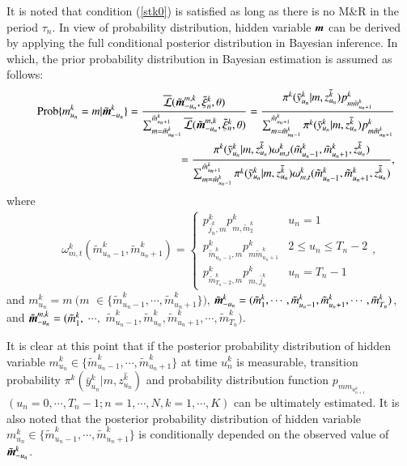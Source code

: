 \documentclass[a4paper,oneside,onecolumn,preprint,10pt,authoryear]{elsarticle}
\begin{document}
It is noted that condition (\ref{stk0}) is satisfied as long as there is no M\&R in the period $\tau_n$. In view of probability distribution, hidden variable $\mbox{\boldmath$m$}$ can be derived by applying the full conditional posterior distribution in Bayesian inference. In which, the prior probability distribution in Bayesian estimation is assumed as follows: 
\begin{eqnarray}
&& \mbox{Prob}\{m_{u_n}^k=m|\tilde{\mbox{\boldmath$m$}}_{-u_n}^k\}
 =\frac{\overline{\cal L}(\tilde{\mbox{\boldmath$m$}}_{-u_n}^{m,k},\tilde{\xi}^k_n,\theta)}{\sum_{m=\tilde{m}_{u_n-1}^k}^{\tilde{m}_{u_n+1}^k} 
\overline{\cal L}(\tilde{\mbox{\boldmath$m$}}_{-u_n}^{m,k},\tilde{\xi}^k_n,\theta)} =\frac{\pi^k(\bar{y}_{u_n}^k|m,\bar{z^k_{u_n}}) p^k_{m\tilde{m}^k_{u_{n}+1}} }{
\sum_{m=\tilde{m}^k_{u_n-1}}^{\tilde{m}^k_{u_n+1}} \pi^k(\bar{y}^k_{u_n}|m,\bar{z^k_{u_n}}) p^k_{m\tilde{m}^k_{u_{n}+1}} }\nonumber\\
&& \hspace{40mm}=\frac{
\pi^k(\bar{y}_{u_n}^k|m,\bar{z^k_{u_n}}) \omega_{m,t}^k(\tilde{m}_{u_{n}-1}^k,\tilde{m}_{u_{n}+1}^k,\bar{z^k_{u_n}}) }{
\sum_{m=\tilde{m}_{u_n-1}^k}^{\tilde{m}_{u_n+1}^k} \pi^k(\bar{y}_{u_n}^k|m,\bar{z^k_{u_n}}) \omega_{m,t}^k(\tilde{m}_{u_{n}-1}^k,\tilde{m}_{u_{n}+1}^k,\bar{z^k_{u_n}}) },
 \label{hhu}
\end{eqnarray}
where
\begin{eqnarray}
&& \omega_{m,t}^k(\tilde{m}_{u_{n}-1}^k,\tilde{m}_{u_{n}+1}^k) 
=\left\{
\begin{array}{ll}
p^k_{\bar{j}_n^k,m}p^k_{m,\tilde{m}_2^{k}} & u_n=1 \\
p^k_{\tilde{m}_{u_{n}-1}^k,m} p^k_{m\tilde{m}_{u_{n}+1}^k} & 2\leq u_n \leq T_n-2 \\
p^k_{\tilde{m}_{T_n-2}^k,m}p^k_{m,\bar{j}_{n}^k} & u_n=T_n-1
\end{array},
\right.
\end{eqnarray}
and $m^k_{u_n}=m ~(m$ $\in \{\tilde{m}^k_{u_n-1},$$\cdots, \tilde{m}^k_{u_n+1}\})$, $\tilde{\mbox{\boldmath$m$}}_{-u_n}^k=(\tilde{m}^k_1,\cdots,\tilde{m}^k_{u_n-1},\tilde{m}^k_{u_n+1},\cdots,\tilde{m}^k_{T_n})$, and $\tilde{\mbox{\boldmath$m$}}_{-u_n}^{m,k}=(\tilde{m}^k_1, $  $ \cdots,$ $\tilde{m}^k_{u_n-1}, \tilde{m}^k_{u_n} ,\tilde{m}^k_{u_n+1}, \cdots, \tilde{m}^k_{T_n})$.

It is clear at this point that if the posterior probability distribution of hidden variable $m^k_{u_n} \in \{\tilde{m}^k_{u_n-1},\cdots,\tilde{m}^k_{u_n+1}\}$ at time $u^k_n$ is measurable, transition probability $\pi^k(\bar{y}^k_{u_n}|m,\bar{z^k_{u_n}})$ and probability distribution function $p_{mm_{u_{n+1}^k}}$~$(u_n=0,\cdots,T_n-1;n=1,\cdots,N,k=1,\cdots,K)$ can be ultimately estimated. It is also noted that the posterior probability distribution of hidden variable $m^k_{u_n} \in \{\tilde{m}^k_{u_n-1},\cdots,\tilde{m}^k_{u_n+1}\}$ is conditionally depended on the observed value of $\tilde{\mbox{\boldmath$m$}}^k_{-u_n}$. 
\end{document}

